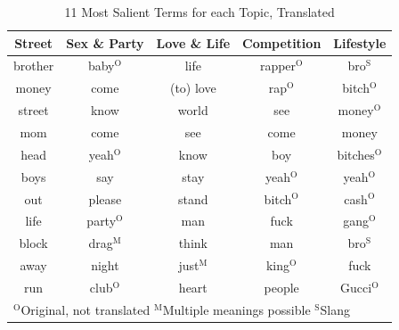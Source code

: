 \documentclass[conference]{IEEEtran}
\begin{document}
\begin{table}[htbp]
\caption{11 Most Salient Terms for each Topic, Translated}
\begin{center}
\begin{tabular}{|c|c|c|c|c|}
\hline
\textbf{Street}&\textbf{Sex \& Party}&\textbf{Love \& Life}&\textbf{Competition}&\textbf{Lifestyle} \\
\cline{1-5}
\hline
brother & baby$^{\mathrm{O}}$ & life & rapper$^{\mathrm{O}}$ & bro$^{\mathrm{S}}$ \\
\hline
money & come & (to) love & rap$^{\mathrm{O}}$ & bitch$^{\mathrm{O}}$ \\
\hline
street & know & world & see & money$^{\mathrm{O}}$ \\
\hline
mom & come & see & come & money \\
\hline
head & yeah$^{\mathrm{O}}$ & know & boy & bitches$^{\mathrm{O}}$ \\
\hline
boys & say & stay & yeah$^{\mathrm{O}}$ & yeah$^{\mathrm{O}}$ \\
\hline
out & please & stand & bitch$^{\mathrm{O}}$ & cash$^{\mathrm{O}}$ \\
\hline
life & party$^{\mathrm{O}}$ & man & fuck & gang$^{\mathrm{O}}$ \\
\hline
block & drag$^{\mathrm{M}}$ & think & man & bro$^{\mathrm{S}}$ \\
\hline
away & night & just$^{\mathrm{M}}$ & king$^{\mathrm{O}}$ & fuck \\
\hline
run & club$^{\mathrm{O}}$ & heart & people & Gucci$^{\mathrm{O}}$ \\
\hline
\hline
\multicolumn{5}{l}{$^{\mathrm{O}}$Original, not translated $^{\mathrm{M}}$Multiple meanings possible $^{\mathrm{S}}$Slang}
\end{tabular}
\label{tab:topics}
\end{center}
\end{table}
\end{document}
